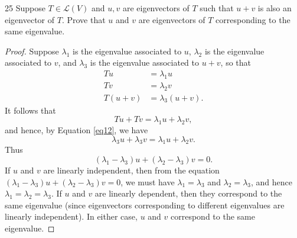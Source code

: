 \documentclass{extarticle}
\newenvironment{problem}[1]{\begin{prob*}{#1}{}}{\end{prob*}}
\newcommand{\Hom}{\mathcal{L}}
\begin{document}
\begin{problem}{25}
Suppose $T\in\Hom(V)$ and $u,v$ are eigenvectors of $T$ such that $u+v$ is also an eigenvector of $T$.  Prove that $u$ and $v$ are eigenvectors of $T$ corresponding to the same eigenvalue.
\end{problem}
\begin{proof}
Suppose $\lambda_1$ is the eigenvalue associated to $u$, $\lambda_2$ is the eigenvalue associated to $v$, and $\lambda_3$ is the eigenvalue associated to $u+v$, so that
\begin{align}
Tu &= \lambda_1 u \label{eq10}\\
Tv &= \lambda_2 v \label{eq11}\\
T(u+v) &= \lambda_3(u+v). \label{eq12}
\end{align}
It follows that
\begin{equation*}
Tu + Tv = \lambda_1 u + \lambda_2 v,
\end{equation*}
and hence, by Equation \ref{eq12}, we have
\begin{equation*}
\lambda_3 u + \lambda_3 v = \lambda_1 u + \lambda_2 v.
\end{equation*}
Thus 
\begin{equation*}
(\lambda_1 - \lambda_3)u + (\lambda_2 - \lambda_3)v = 0.
\end{equation*}
If $u$ and $v$ are linearly independent, then from the equation $(\lambda_1 - \lambda_3)u + (\lambda_2 - \lambda_3)v = 0$, we must have $\lambda_1 = \lambda_3$ and $\lambda_2 = \lambda_3$, and hence $\lambda_1 = \lambda_2 = \lambda_3$. If $u$ and $v$ are linearly dependent, then they correspond to the same eigenvalue (since eigenvectors corresponding to different eigenvalues are linearly independent). In either case, $u$ and $v$ correspond to the same eigenvalue.
\end{proof}
\end{document}
